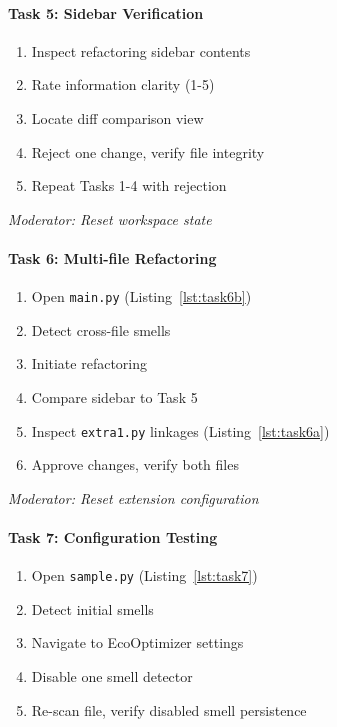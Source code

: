 \documentclass{article}
\begin{document}
\paragraph{Task 5: Sidebar Verification}
\begin{enumerate}
    \item Inspect refactoring sidebar contents
    \item Rate information clarity (1-5)
    \item Locate diff comparison view
    \item Reject one change, verify file integrity
    \item Repeat Tasks 1-4 with rejection
\end{enumerate}

\emph{Moderator: Reset workspace state}

\paragraph{Task 6: Multi-file Refactoring}
\begin{enumerate}
    \item Open \texttt{main.py} (Listing~\ref{lst:task6b})
    \item Detect cross-file smells
    \item Initiate refactoring
    \item Compare sidebar to Task 5
    \item Inspect \texttt{extra1.py} linkages (Listing~\ref{lst:task6a})
    \item Approve changes, verify both files
\end{enumerate}

\emph{Moderator: Reset extension configuration}

\paragraph{Task 7: Configuration Testing}
\begin{enumerate}
    \item Open \texttt{sample.py} (Listing~\ref{lst:task7})
    \item Detect initial smells
    \item Navigate to EcoOptimizer settings
    \item Disable one smell detector
    \item Re-scan file, verify disabled smell persistence
\end{enumerate}
\end{document}
